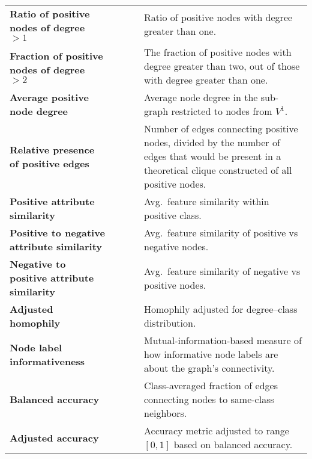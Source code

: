 \begin{table*}
\begin{tabularx}{\linewidth}{XcccX}
		\textbf{Ratio of positive nodes of degree $>1$}    & \checkmark    & \checkmark         & \crossmark          & Ratio of positive nodes with degree greater than one. \\
		\textbf{Fraction of positive nodes of degree $>2$} & \checkmark    & \checkmark         & \crossmark          & The fraction of positive nodes with degree greater than two, out of those with degree greater than one. \\
		\textbf{Average positive node degree}              & \checkmark    & \checkmark         & \crossmark          & Average node degree in the sub-graph restricted to nodes from $V^1$. \\
		\textbf{Relative presence of positive edges}       & \checkmark    & \checkmark         & \crossmark          & Number of edges connecting positive nodes, divided by the number of edges that would be present in a theoretical clique constructed of all positive nodes. \\
		\textbf{Positive attribute similarity}             & \checkmark    & \crossmark         & \checkmark          & Avg.\ feature similarity within positive class. \\
		\textbf{Positive to negative attribute similarity} & \checkmark    & \crossmark         & \checkmark          & Avg.\ feature similarity of positive vs negative nodes. \\
		\textbf{Negative to positive attribute similarity} & \checkmark    & \crossmark         & \checkmark          & Avg.\ feature similarity of negative vs positive nodes. \\
		\textbf{Adjusted homophily}                        & \checkmark    & \checkmark         & \crossmark          & Homophily adjusted for degree–class distribution. \\
		\textbf{Node label informativeness}                & \checkmark    & \checkmark         & \crossmark          & Mutual‐information‐based measure of how informative node labels are about the graph’s connectivity. \\
		\textbf{Balanced accuracy}                         & \checkmark    & \checkmark         & \crossmark          & Class‐averaged fraction of edges connecting nodes to same‐class neighbors. \\
		\textbf{Adjusted accuracy}                         & \checkmark    & \checkmark         & \crossmark          & Accuracy metric adjusted to range $[0,1]$ based on balanced accuracy. \\
		\bottomrule
	\end{tabularx}
\end{table*}
